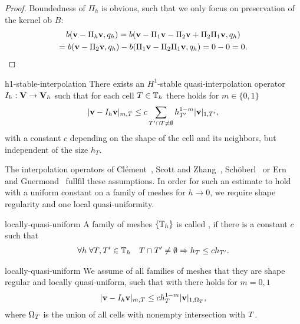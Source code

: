 \begin{proof}
  Boundedness of $\Pi_h$ is obvious, such that we only focus on
  preservation of the kernel ob $B$:
  \begin{multline}
    b(\mathbf v-\Pi_h \mathbf v,q_h) = b(\mathbf v-\Pi_1 \mathbf v - \Pi_2 \mathbf v + \Pi_2\Pi_1 \mathbf v, q_h)
    \\
    = b(\mathbf v-\Pi_2 \mathbf v, q_h) - b(\Pi_1 \mathbf v - \Pi_2\Pi_1 \mathbf v,q_h) = 0-0 = 0.
  \end{multline}
\end{proof}

\begin{Assumption}{h1-stable-interpolation}
  There exists an $H^1$-stable quasi-interpolation operator
  $I_h:\mathbf V\to \mathbf V_h$ such that for each cell $T \in \mathbb T_h$ there
  holds for $m\in\{0,1\}$
  \begin{gather}
    \label{eq:stokes:13}
    \lvert\mathbf v-I_h \mathbf v\rvert_{m,T} \le c \sum_{T'\cap T
      \neq\emptyset} h_{T'}^{1-m}\lvert\mathbf v\rvert_{1,T'},
  \end{gather}
  with a constant $c$ depending on the shape of the cell and its
  neighbors, but independent of the size $h_T$.
\end{Assumption}

\begin{remark}
  The interpolation operators of Clément~\cite{Clement75}, Scott and
  Zhang~\cite{ScottZhang90},
  Schöberl~\cite{Schoeberl08,Schoeberl10multilevel-hcurl} or Ern and
  Guermond~\cite{ErnGuermond17} fullfil these assumptions. In order
  for such an estimate to hold with a uniform constant on a family of
  meshes for $h\to 0$, we require shape regularity and one local
  quasi-uniformity.
\end{remark}

\begin{Definition}{locally-quasi-uniform}
  A family of meshes $\{\mathbb T_h\}$ is called , if there is a constant $c$ such that
  \begin{gather}
    \label{eq:stokes:14}
    \forall h
    \;
    \forall T,T'\in \mathbb T_h
    \quad
    T\cap T'\neq \emptyset
    \Rightarrow
    h_T \le c h_{T'}.
  \end{gather}
\end{Definition}

\begin{Assumption}{locally-quasi-uniform}
  We assume of all families of meshes that they are shape regular and
  locally quasi-uniform, such that with
   there holds
  for $m=0,1$
  \begin{gather}
    \label{eq:stokes:15}
    \lvert\mathbf v-I_h \mathbf v\rvert_{m,T} \le c h_T^{1-m} \lvert\mathbf v\rvert_{1,\Omega_T},
  \end{gather}
  where $\Omega_T$ is the union of all cells with nonempty
  intersection with $T$.
\end{Assumption}


